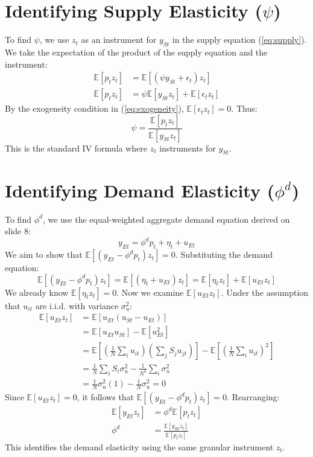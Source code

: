 \documentclass[11pt]{article}
\begin{document}
\section{Identifying Supply Elasticity ($\psi$)}
To find $\psi$, we use $z_t$ as an instrument for $y_{St}$ in the supply equation (\ref{eq:supply}). We take the expectation of the product of the supply equation and the instrument:
\begin{align*}
\mathbb{E}[p_t z_t] &= \mathbb{E}[(\psi y_{St} + \epsilon_t) z_t] \\
\mathbb{E}[p_t z_t] &= \psi \mathbb{E}[y_{St} z_t] + \mathbb{E}[\epsilon_t z_t]
\end{align*}
By the exogeneity condition in (\ref{eq:exogeneity}), $\mathbb{E}[\epsilon_t z_t] = 0$. Thus:
\begin{equation}
\psi = \frac{\mathbb{E}[p_t z_t]}{\mathbb{E}[y_{St} z_t]}
\end{equation}
This is the standard IV formula where $z_t$ instruments for $y_{St}$.

\section{Identifying Demand Elasticity ($\phi^d$)}
To find $\phi^d$, we use the equal-weighted aggregate demand equation derived on slide 8:
\begin{equation}
y_{Et} = \phi^d p_t + \eta_t + u_{Et} \tag{41}
\end{equation}
We aim to show that $\mathbb{E}[(y_{Et} - \phi^d p_t) z_t] = 0$. Substituting the demand equation:
\begin{equation}
\mathbb{E}[(y_{Et} - \phi^d p_t) z_t] = \mathbb{E}[(\eta_t + u_{Et}) z_t] = \mathbb{E}[\eta_t z_t] + \mathbb{E}[u_{Et} z_t]
\end{equation}
We already know $\mathbb{E}[\eta_t z_t] = 0$. Now we examine $\mathbb{E}[u_{Et} z_t]$. Under the assumption that $u_{it}$ are i.i.d. with variance $\sigma_u^2$:
\begin{align*}
\mathbb{E}[u_{Et} z_t] &= \mathbb{E}[u_{Et} (u_{St} - u_{Et})] \\
&= \mathbb{E}[u_{Et} u_{St}] - \mathbb{E}[u_{Et}^2] \\
&= \mathbb{E} \left[ \left( \frac{1}{N} \sum_{i} u_{it} \right) \left( \sum_{j} S_j u_{jt} \right) \right] - \mathbb{E} \left[ \left( \frac{1}{N} \sum_{i} u_{it} \right)^2 \right] \\
&= \frac{1}{N} \sum_{i} S_i \sigma_u^2 - \frac{1}{N^2} \sum_{i} \sigma_u^2 \\
&= \frac{1}{N} \sigma_u^2 (1) - \frac{1}{N} \sigma_u^2 = 0
\end{align*}
Since $\mathbb{E}[u_{Et} z_t] = 0$, it follows that $\mathbb{E}[(y_{Et} - \phi^d p_t) z_t] = 0$. Rearranging:
\begin{align*}
\mathbb{E}[y_{Et} z_t] &= \phi^d \mathbb{E}[p_t z_t] \\
\phi^d &= \frac{\mathbb{E}[y_{Et} z_t]}{\mathbb{E}[p_t z_t]}
\end{align*}
This identifies the demand elasticity using the same granular instrument $z_t$.
\end{document}
